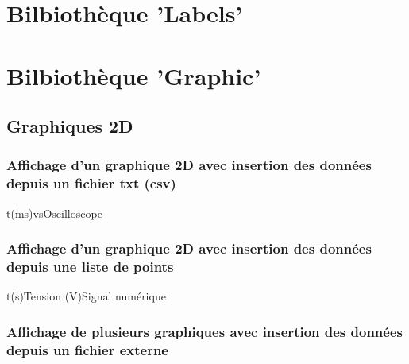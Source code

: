 \chapter{Bilbiothèque 'Labels'}




\chapter{Bilbiothèque 'Graphic'}

\section{Graphiques 2D}
\subsection{Affichage d'un graphique 2D avec insertion des données depuis un fichier txt (csv)}


\begin{graphic}{0.8}{0.6}{0}{2.1}{-1.1}{1.1}{t(ms)}{vs}{Oscilloscope}
\end{graphic}

\subsection{Affichage d'un graphique 2D avec insertion des données depuis une liste de points}


\begin{graphic}{0.8}{0.4}{0}{40}{-1}{6}{t(s)}{Tension (V)}{Signal numérique}
\end{graphic}


\subsection{Affichage de plusieurs graphiques avec insertion des données depuis un fichier externe}



